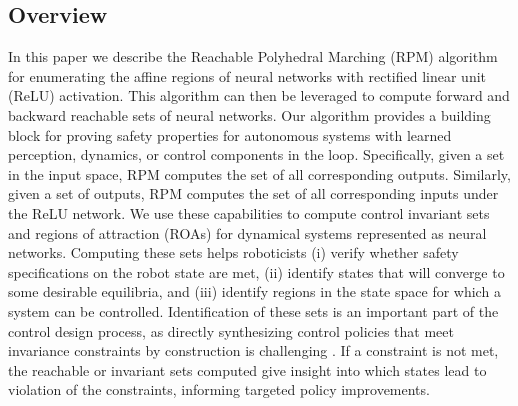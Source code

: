 \subsection{Overview}

In this paper we describe the Reachable Polyhedral Marching (RPM) algorithm for enumerating the affine regions of neural networks with rectified linear unit (ReLU) activation.
This algorithm can then be leveraged to compute forward and backward reachable sets of neural networks.
Our algorithm provides a building block for proving safety properties for autonomous systems with learned perception, dynamics, or control components in the loop.  
Specifically, given a set in the input space, RPM computes the set of all corresponding outputs. 
Similarly, given a set of outputs, RPM computes the set of all corresponding inputs under the ReLU network.  
We use these capabilities to compute control invariant sets and regions of attraction (ROAs) for dynamical systems represented as neural networks.
Computing these sets helps roboticists (i) verify whether safety specifications on the robot state are met, (ii) identify states that will converge to some desirable equilibria, and (iii) identify regions in the state space for which a system can be controlled.
Identification of these sets is an important part of the control design process, as directly synthesizing control policies that meet invariance constraints by construction is challenging \cite{blanchini2008set}.
If a constraint is not met, the reachable or invariant sets computed give insight into which states lead to violation of the constraints, informing targeted policy improvements.





